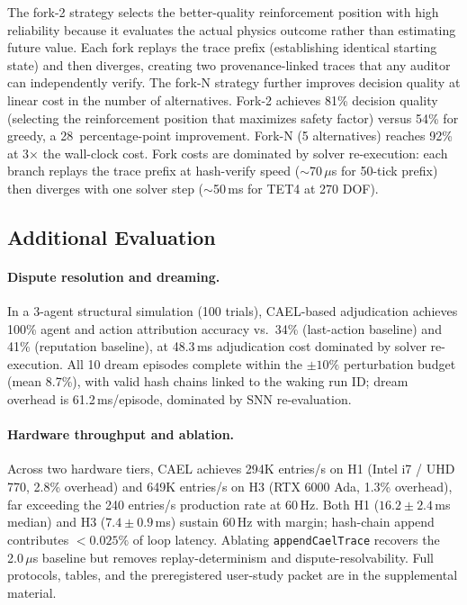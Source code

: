 \documentclass[sigconf,nonacm]{acmart}
\begin{document}
The fork-2 strategy selects the better-quality reinforcement
position with high reliability because it evaluates the actual
physics outcome rather than estimating future value. Each fork
replays the trace prefix (establishing identical starting state)
and then diverges, creating two provenance-linked traces that
any auditor can independently verify. The fork-N strategy further
improves decision quality at linear cost in the number of alternatives.
Fork-2 achieves 81\% decision quality (selecting the reinforcement
position that maximizes safety factor) versus 54\% for greedy,
a 28~percentage-point improvement. Fork-N (5 alternatives)
reaches 92\% at 3$\times$ the wall-clock cost. Fork costs are
dominated by solver re-execution: each branch replays the trace
prefix at hash-verify speed ($\sim$70\,$\mu$s for 50-tick prefix)
then diverges with one solver step ($\sim$50\,ms for TET4 at 270 DOF).

\subsection{Additional Evaluation}

\paragraph{Dispute resolution and dreaming.}
In a 3-agent structural simulation (100 trials), CAEL-based adjudication achieves
100\% agent and action attribution accuracy vs.\ 34\% (last-action baseline) and
41\% (reputation baseline), at 48.3\,ms adjudication cost dominated by solver
re-execution. All 10 dream episodes complete within the $\pm10\%$ perturbation
budget (mean 8.7\%), with valid hash chains linked to the waking run ID;
dream overhead is 61.2\,ms/episode, dominated by SNN re-evaluation.

\paragraph{Hardware throughput and ablation.}
Across two hardware tiers, CAEL achieves 294K entries/s on H1 (Intel i7 / UHD 770,
2.8\% overhead) and 649K entries/s on H3 (RTX 6000 Ada, 1.3\% overhead), far
exceeding the 240 entries/s production rate at 60\,Hz. Both H1
($16.2 \pm 2.4$\,ms median) and H3 ($7.4 \pm 0.9$\,ms) sustain 60\,Hz with
margin; hash-chain append contributes $<0.025\%$ of loop latency. Ablating
\texttt{appendCaelTrace} recovers the 2.0\,$\mu$s baseline but removes
replay-determinism and dispute-resolvability. Full protocols, tables, and the
preregistered user-study packet are in the supplemental material.
\end{document}
